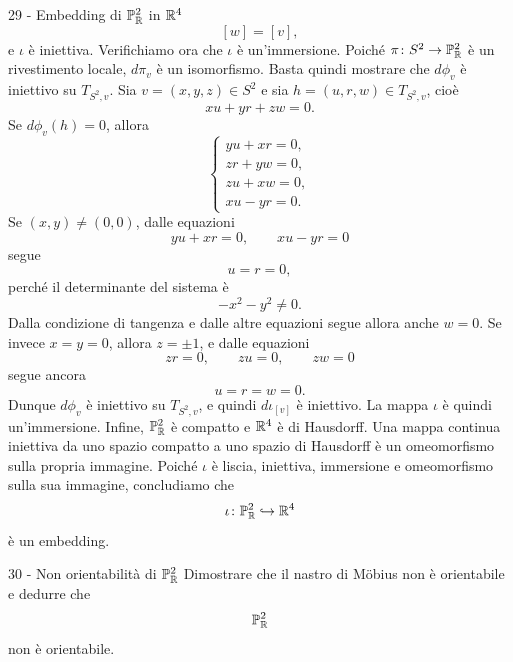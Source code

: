 \documentclass[a4paper]{article}
\begin{document}
\begin{snippetsolution}{29 - Embedding di \(\mathbb{P}^2_{\mathbb{R}}\)
    in \(\mathbb{R}^4\)}
\[        [w]=[v],
    \]
    e \(\iota\) è iniettiva.
    Verifichiamo ora che \(\iota\) è un'immersione. Poiché \(\pi\colon S^2\to\mathbb{P}^2_{\mathbb{R}}\) è un rivestimento locale, \(d\pi_v\) è un isomorfismo. Basta quindi mostrare che \(d\phi_v\) è iniettivo su \(T_{S^2,v}\).
    Sia \(v=(x,y,z)\in S^2\) e sia \(h=(u,r,w)\in T_{S^2,v}\), cioè
    \[
        xu+yr+zw=0.
    \]
    Se \(d\phi_v(h)=0\), allora
    \[
        \begin{cases}
            yu+xr=0,\\
            zr+yw=0,\\
            zu+xw=0,\\
            xu-yr=0.
        \end{cases}
    \]
    Se \((x,y)\neq(0,0)\), dalle equazioni
    \[
        yu+xr=0,
        \qquad
        xu-yr=0
    \]
    segue
    \[
        u=r=0,
    \]
    perché il determinante del sistema è
    \[
        -x^2-y^2\neq0.
    \]
    Dalla condizione di tangenza e dalle altre equazioni segue allora anche \(w=0\). Se invece \(x=y=0\), allora \(z=\pm1\), e dalle equazioni
    \[
        zr=0,
        \qquad
        zu=0,
        \qquad
        zw=0
    \]
    segue ancora
    \[
        u=r=w=0.
    \]
    Dunque \(d\phi_v\) è iniettivo su \(T_{S^2,v}\), e quindi \(d\iota_{[v]}\) è iniettivo. La mappa \(\iota\) è quindi un'immersione.
    Infine, \(\mathbb{P}^2_{\mathbb{R}}\) è compatto e \(\mathbb{R}^4\) è di Hausdorff. Una mappa continua iniettiva da uno spazio compatto a uno spazio di Hausdorff è un omeomorfismo sulla propria immagine. Poiché \(\iota\) è liscia, iniettiva, immersione e omeomorfismo sulla sua immagine, concludiamo che
    \[
        \iota\colon\mathbb{P}^2_{\mathbb{R}}\hookrightarrow\mathbb{R}^4
    \]
    è un embedding.
\end{snippetsolution}

\begin{snippetexercise}{30 - Non orientabilità di \(\mathbb{P}^2_{\mathbb{R}}\)}
    Dimostrare che il nastro di Möbius non è orientabile e dedurre che
    \[
        \mathbb{P}^2_{\mathbb{R}}
    \]
    non è orientabile.
\end{snippetexercise}
\end{document}

